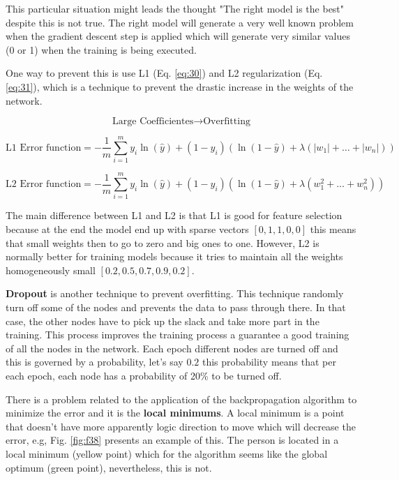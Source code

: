 \documentclass{article}
\begin{document}
This particular situation might leads the thought "The right model is the best" despite this is not true. The right model will generate a very well known problem when the gradient descent step is applied which will generate very similar values (0 or 1) when the training is being executed.

One way to prevent this is use L1 (Eq. \eqref{eq:30}) and L2 regularization (Eq. \eqref{eq:31}), which is a technique to prevent the drastic increase in the weights of the network.

\[\text{Large Coefficientes} \rightarrow \text{Overfitting}\]

\begin{equation}
\label{eq:30}
\text{L1 Error function} = - \frac{1}{m} \sum_{i=1}^m y_i\ln{(\hat{y})} + (1 - y_i) (\ln{(1 - \hat{y})} + \lambda (|w_1|+\dots+|w_n|))
\end{equation}

\begin{equation}
\label{eq:31}
\text{L2 Error function} = - \frac{1}{m} \sum_{i=1}^m y_i\ln{(\hat{y})} + (1 - y_i) (\ln{(1 - \hat{y})} + \lambda (w_1^2+\dots+w_n^2))
\end{equation}

The main difference between L1 and L2 is that L1 is good for feature selection because at the end the model end up with sparse vectors \([0,1,1,0,0]\) this means that small weights then to go to zero and big ones to one. However, L2 is normally better for training models because it tries to maintain all the weights homogeneously small \([0.2, 0.5, 0.7 ,0.9, 0.2]\).

\textbf{Dropout} is another technique to prevent overfitting. This technique randomly turn off some of the nodes and prevents the data to pass through there. In that case, the other nodes have to pick up the slack and take more part in the training. This process improves the training process a guarantee a good training of all the nodes in the network. Each epoch different nodes are turned off and this is governed by a probability, let's say \(0.2\) this probability means that per each epoch, each node has a probability of 20\% to be turned off. 

There is a problem related to the application of the backpropagation algorithm to minimize the error and it is the \textbf{local minimums}. A local minimum is a point that doesn't have more apparently logic direction to move which will decrease the error, e.g, Fig. \ref{fig:f38} presents an example of this. The person is located in a local minimum (yellow point) which for the algorithm seems like the global optimum (green point), nevertheless, this is not.
\end{document}
